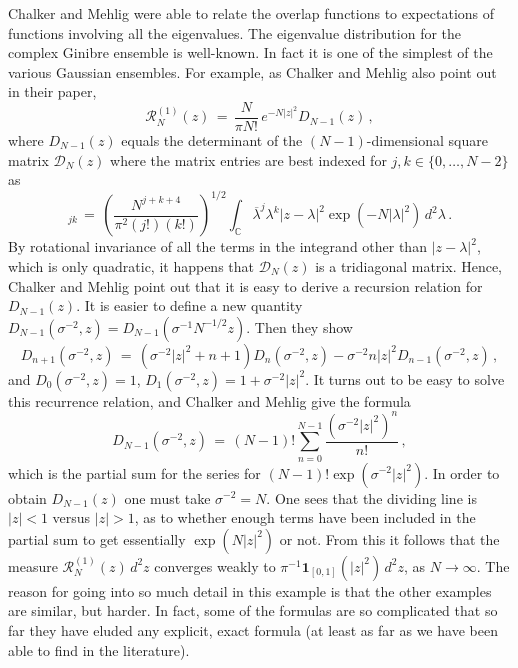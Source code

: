 \documentclass[12pt]{report}
\newcommand{\C}{\mathbb{C}}
\newcommand{\be}{\begin{equation}}
\newcommand{\ee}{\end{equation}}
\theoremstyle{definition}
\begin{document}
Chalker and Mehlig were able to relate the overlap functions to expectations of functions involving all
the eigenvalues. The eigenvalue distribution for the complex Ginibre ensemble is well-known.
In fact it is one of the simplest of the various Gaussian ensembles.
For example, as Chalker and Mehlig also point out in their paper,
\be
\label{eq:RD}
\mathcal{R}_N^{(1)}(z)\, =\, \frac{N}{\pi N!}\, e^{-N |z|^2} D_{N-1}(z)\, ,
\ee
where $D_{N-1}(z)$ equals the determinant of the $(N-1)$-dimensional square 
matrix $\mathcal{D}_N(z)$ where the matrix entries are best indexed for $j,k \in \{0,\dots,N-2\}$ as 
\be
[\mathcal{D}_N(z)]_{jk}\, =\, \left(\frac{N^{j+k+4}}{\pi^2 (j!) (k!)}\right)^{1/2} \int_{\C} \overline{\lambda}^j \lambda^k
|z-\lambda|^2 \exp(-N|\lambda|^2)\, 
d^2\lambda\, .
\ee
By rotational invariance of all the terms in the integrand other than $|z-\lambda|^2$, which is only
quadratic, it happens that $\mathcal{D}_N(z)$ is a tridiagonal matrix.
Hence, Chalker and Mehlig point out that it is easy to derive a recursion relation for $D_{N-1}(z)$.
It is easier to define a new quantity $D_{N-1}(\sigma^{-2},z) = D_{N-1}(\sigma^{-1} N^{-1/2} z)$.
Then they show
\be
\label{eq:Dr}
D_{n+1}(\sigma^{-2},z)\, =\, (\sigma^{-2}|z|^2+n+1) D_n(\sigma^{-2},z) - \sigma^{-2} n |z|^2 D_{n-1}(\sigma^{-2},z)\, ,
\ee
and $D_0(\sigma^{-2},z)=1$, $D_1(\sigma^{-2},z) = 1+\sigma^{-2}|z|^2$. It turns out to be easy to solve this recurrence relation,
and Chalker and Mehlig give the formula
\begin{equation}
\label{eq:D}
D_{N-1}(\sigma^{-2},z)\, =\, (N-1)! \sum_{n=0}^{N-1} \frac{(\sigma^{-2}|z|^2)^n}{n!}\, ,
\end{equation}
which is the partial sum for the series for $(N-1)! \exp(\sigma^{-2}|z|^2)$. In order to obtain $D_{N-1}(z)$ one must take $\sigma^{-2}=N$.
One sees that the dividing line is $|z|<1$ versus $|z|>1$, as to whether enough terms have been included in the partial sum
to get essentially $\exp(N|z|^2)$ or not. From this it follows that the measure $\mathcal{R}_N^{(1)}(z)\, d^2z$ converges 
weakly to $\pi^{-1} \mathbf{1}_{[0,1]}(|z|^2)\, d^2z$, as $N \to \infty$.
The reason for going into so much detail in this example is that the other examples are similar, but harder.
In fact, some of the formulas are so complicated that so far they have eluded any explicit, exact formula (at least as far as we have been able to find in the literature).
\end{document}
